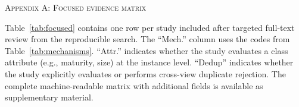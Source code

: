 \clearpage
\makeatletter
\setcounter{section}{0}
\renewcommand{\thesection}{\Alph{section}}
\renewcommand{\theHsection}{appendix.\Alph{section}}
\makeatother

\label{app:focused}

\begin{center}
\textsc{Appendix A: Focused evidence matrix}
\end{center}

Table~\ref{tab:focused} contains one row per study included after targeted full-text review from the reproducible search. The ``Mech.'' column uses the codes from Table~\ref{tab:mechanisms}. ``Attr.'' indicates whether the study evaluates a class attribute (e.g., maturity, size) at the instance level. ``Dedup'' indicates whether the study explicitly evaluates or performs cross-view duplicate rejection. The complete machine-readable matrix with additional fields is available as supplementary material.

